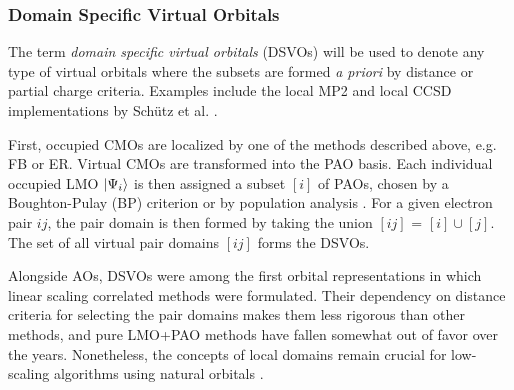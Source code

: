 
\subsubsection*{Domain Specific Virtual Orbitals}

The term \emph{domain specific virtual orbitals} (DSVOs) will be used to denote any type of virtual orbitals where the subsets are formed \emph{a priori} by distance or partial charge criteria. Examples include the local MP2 and local CCSD implementations by Schütz et al. \cite{Sch1999,Sch2001,Sch2000}.%

First, occupied CMOs are localized by one of the methods described above, e.g. FB or ER. Virtual CMOs are transformed into the PAO basis. Each individual occupied LMO $\ket{\Psi_i}$ is then assigned a subset $[i]$ of PAOs, chosen by a Boughton-Pulay (BP) criterion \cite{Bou1993} or by population analysis \cite{Mat2008}. For a given electron pair $ij$, the pair domain is then formed by taking the union $[ij]$ = $[i] \cup [j]$. The set of all virtual pair domains $[ij]$ forms the DSVOs.

Alongside AOs, DSVOs were among the first orbital representations in which linear scaling correlated methods were formulated. Their dependency on distance criteria for selecting the pair domains makes them less rigorous than other methods, and pure LMO+PAO methods have fallen somewhat out of favor over the years. Nonetheless, the concepts of local domains remain crucial for low-scaling algorithms using natural orbitals \cite{Rip2013}.


